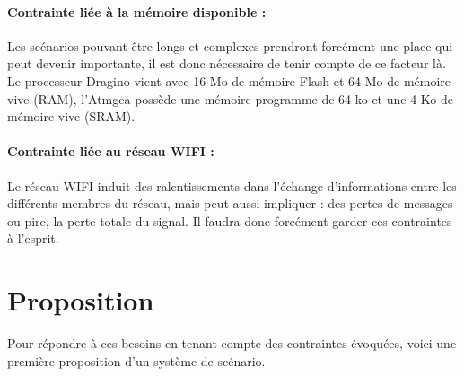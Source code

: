 \paragraph{Contrainte liée à la mémoire disponible :}
Les scénarios pouvant être longs et complexes prendront forcément une place qui peut devenir importante, il est donc nécessaire de tenir compte de ce facteur là. Le processeur Dragino vient avec 16 Mo de mémoire Flash et 64 Mo de mémoire vive (RAM), l'Atmgea possède une mémoire programme de 64 ko et une 4 Ko de mémoire vive (SRAM).
\paragraph{Contrainte liée au réseau WIFI :}
Le réseau WIFI induit des ralentissements dans l'échange d'informations entre les différents membres du réseau, mais peut aussi impliquer : des pertes de messages ou pire, la perte totale du signal. Il faudra donc forcément garder ces contraintes à l'esprit.
\newpage
\section{Proposition}
Pour répondre à ces besoins en tenant compte des contraintes évoquées, voici une première proposition d'un système de scénario.
